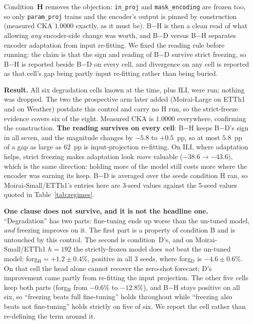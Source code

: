 \documentclass{article}
\begin{document}
Condition~\textbf{H} removes the objection: \texttt{in\_proj} and \texttt{mask\_encoding} are frozen
too, so only \texttt{param\_proj} trains and the encoder's output is pinned by construction
(measured CKA $1.0000$ exactly, as it must be). B$-$H is then a clean read of what allowing
\emph{any} encoder-side change was worth, and B$-$D versus B$-$H separates encoder adaptation from
input re-fitting. We fixed the reading rule before running: the claim is that the sign and reading of
B$-$D survive strict freezing, so B$-$H is reported beside B$-$D on every cell, and divergence on any
cell is reported as that cell's gap being partly input re-fitting rather than being buried.

\textbf{Result.} All six degradation cells known at the time, plus ILI, were run; nothing was dropped.
The two the prospective arm later added (Moirai-Large on ETTh1 and on Weather) postdate this control
and carry no H run, so the strict-freeze evidence covers six of the eight. Measured CKA is
$1.0000$ everywhere, confirming the construction. \textbf{The reading survives on every cell}: B$-$H
keeps B$-$D's sign in all seven, and the magnitude changes by $-5.8$ to $+0.5$~pp, so at most
$5.8$~pp of a gap as large as $62$~pp is input-projection re-fitting. On ILI, where adaptation helps,
strict freezing makes adaptation look \emph{more} valuable ($-38.6 \to -43.6$), which is the same
direction: holding more of the model still costs more where the encoder was earning its keep.
B$-$D is averaged over the seeds condition H ran, so Moirai-Small/ETTh1's entries here are 3-seed
values against the 5-seed values quoted in Table~\ref{tab:regimes}.



\textbf{One clause does not survive, and it is not the headline one.} ``Degradation'' has two parts:
fine-tuning ends up worse than the un-tuned model, \emph{and} freezing improves on it. The first part
is a property of condition B and is untouched by this control. The second is condition~D's, and on
Moirai-Small/ETTh1 $h{=}192$ the strictly-frozen model does \emph{not} beat the un-tuned model:
forg$_\text{H}={+}1.2{\pm}0.4\%$, positive in all 3 seeds, where forg$_\text{D}$ is
$-4.6{\pm}0.6\%$. On that cell the head alone cannot recover the zero-shot forecast; D's improvement
came partly from re-fitting the input projection. The other five cells keep both parts
(forg$_\text{H}$ from $-0.6\%$ to $-12.8\%$), and B$-$H stays positive on all six, so
``freezing beats full fine-tuning'' holds throughout while ``freezing also beats not fine-tuning''
holds strictly on five of six. We report the cell rather than re-defining the term around it.
\end{document}
